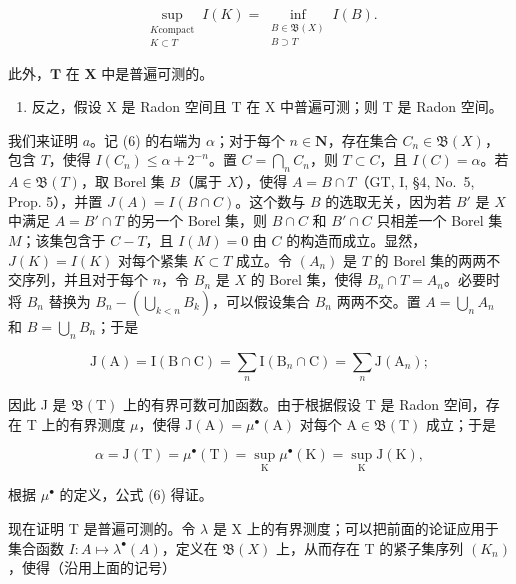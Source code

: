 \[
\sup_{\substack{K\text{compact}\\ K\subset T}}I(K) = \inf_{\substack{B\in \mathfrak{B}(X)\\ B\supset T}}I(B).\tag{6}
\]

此外，\(\mathbf{T}\) 在 \(\mathbf{X}\) 中是普遍可测的。

\begin{enumerate}
\def\labelenumi{\alph{enumi})}
\setcounter{enumi}{1}
\tightlist
\item
  反之，假设 X 是 Radon 空间且 T 在 X 中普遍可测；则 T 是 Radon 空间。
\end{enumerate}

我们来证明 \(a\)。记 (6) 的右端为 \(\alpha\)；对于每个 \(n \in \mathbf{N}\)，存在集合 \(C_n \in \mathfrak{B}(X)\)，包含 \(T\)，使得 \(I(C_n) \leqslant \alpha + 2^{-n}\)。置 \(C = \bigcap_{n} C_n\)，则 \(T \subset C\)，且 \(I(C) = \alpha\)。若 \(A \in \mathfrak{B}(T)\)，取 Borel 集 \(B\)（属于 \(X\)），使得 \(A = B \cap T\)（GT, I, §4, No.~5, Prop. 5），并置 \(J(A) = I(B \cap C)\)。这个数与 \(B\) 的选取无关，因为若 \(B'\) 是 \(X\) 中满足 \(A = B' \cap T\) 的另一个 Borel 集，则 \(B \cap C\) 和 \(B' \cap C\) 只相差一个 Borel 集 \(M\)；该集包含于 \(C - T\)，且 \(I(M) = 0\) 由 \(C\) 的构造而成立。显然，\(J(K) = I(K)\) 对每个紧集 \(K \subset T\) 成立。令 \((A_n)\) 是 \(T\) 的 Borel 集的两两不交序列，并且对于每个 \(n\)，令 \(B_n\) 是 \(X\) 的 Borel 集，使得 \(B_n \cap T = A_n\)。必要时将 \(B_n\) 替换为 \(B_n - \left( \bigcup_{k < n} B_k \right)\)，可以假设集合 \(B_n\) 两两不交。置 \(A = \bigcup_{n} A_n\) 和 \(B = \bigcup_{n} B_n\)；于是

\[
\mathrm{J} (\mathrm{A}) = \mathrm{I} (\mathrm{B} \cap \mathrm{C}) = \sum_ {n} \mathrm{I} (\mathrm{B} _ {n} \cap \mathrm{C}) = \sum_ {n} \mathrm{J} (\mathrm{A} _ {n});
\]

因此 J 是 \(\mathfrak{B}(\mathrm{T})\) 上的有界可数可加函数。由于根据假设 T 是 Radon 空间，存在 T 上的有界测度 \(\mu\)，使得 \(\mathrm{J}(\mathrm{A}) = \mu^{\bullet}(\mathrm{A})\) 对每个 \(\mathrm{A} \in \mathfrak{B}(\mathrm{T})\) 成立；于是

\[
\alpha = \mathrm{J} (\mathrm{T}) = \mu^ {\bullet} (\mathrm{T}) = \sup _ {\mathrm{K}} \mu^ {\bullet} (\mathrm{K}) = \sup _ {\mathrm{K}} \mathrm{J} (\mathrm{K}),
\]

根据 \(\mu^{\bullet}\) 的定义，公式 (6) 得证。

现在证明 T 是普遍可测的。令 \(\lambda\) 是 X 上的有界测度；可以把前面的论证应用于集合函数 \(I: A \mapsto \lambda^{\bullet}(A)\)，定义在 \(\mathfrak{B}(X)\) 上，从而存在 T 的紧子集序列 \((K_{n})\)，使得（沿用上面的记号）

